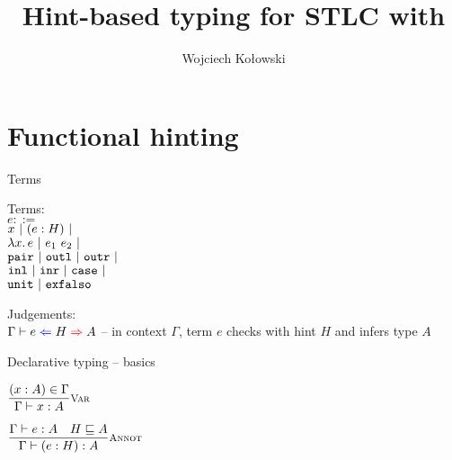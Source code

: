 \documentclass{beamer}
\title{Hint-based typing for STLC with }
\author{Wojciech Kołowski}
\date{}
\begin{document}
\newcommand{\funpair}{\texttt{pair}}
\newcommand{\funoutl}{\texttt{outl}}
\newcommand{\funoutr}{\texttt{outr}}
\newcommand{\funinl}{\texttt{inl}}
\newcommand{\funinr}{\texttt{inr}}
\newcommand{\funcase}{\texttt{case}}
\newcommand{\funexfalso}{\texttt{exfalso}}

\frame{\titlepage}

\section{Functional hinting}

\begin{frame}{Terms}

Terms: \\
$e ::=$ \\
\qquad $x \pipe \annot{e}{H} \pipe $ \\
\qquad $\fun{x}{e} \pipe \app{e_1}{e_2} \pipe$ \\
\qquad $\funpair \pipe \funoutl \pipe \funoutr \pipe$ \\
\qquad $\funinl \pipe \funinr \pipe \funcase \pipe$ \\
\qquad $\unit \pipe \funexfalso$

\vspace{2em}

Judgements: \\
$\fullhinting{\Gamma}{e}{H}{A}$ -- in context $\Gamma$, term $e$ checks with hint $H$ and infers type $A$

\end{frame}

\begin{frame}{Declarative typing -- basics}

\begin{center}
  $\infrule[Var]{\sidecond{(x : A) \in \Gamma}}{\typing{x}{A}}$

  \vspace{2em}

  $\infrule[Annot]{\typing{e}{A} \quad \sidecond{\hintorder{H}{A}}}{\typing{\annot{e}{H}}{A}}$
\end{center}

\end{frame}
\end{document}
